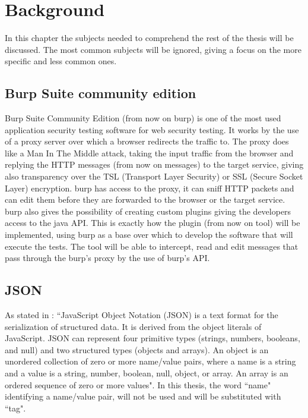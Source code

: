 \chapter{Background}
\label{chap:Background}
In this chapter the subjects needed to comprehend the rest of the thesis will be discussed. The most common subjects will be ignored, giving a focus on the more specific and less common ones.

\section{Burp Suite community edition}
Burp Suite Community Edition (from now on \Gls{burp}) is one of the most used application security testing software for web security testing. It works by the use of a proxy server over which a browser redirects the traffic to. The proxy does like a Man In The Middle attack, taking the input traffic from the browser and replying the HTTP messages (from now on messages) to the target service, giving also transparency over the TSL (Transport Layer Security) or SSL (Secure Socket Layer) encryption. \Gls{burp} has access to the proxy, it can sniff HTTP packets and can edit them before they are forwarded to the browser or the target service. \Gls{burp} also gives the possibility of creating custom plugins giving the developers access to the java API. This is exactly how the plugin (from now on tool) will be implemented, using \Gls{burp} as a base over which to develop the software that will execute the tests. The tool will be able to intercept, read and edit messages that pass through the \Gls{burp}'s proxy by the use of \Gls{burp}'s API.

\section{JSON}
As stated in \cite{json_standard}: ``JavaScript Object Notation (JSON) is a text format for the serialization of structured data.  It is derived from the object literals of JavaScript. JSON can represent four primitive types (strings, numbers, booleans, and null) and two structured types (objects and arrays). An object is an unordered collection of zero or more name/value pairs, where a name is a string and a value is a string, number, boolean, null, object, or array. An array is an ordered sequence of zero or more values".
In this thesis, the word ``name" identifying a name/value pair, will not be used and will be substituted with ``tag".

